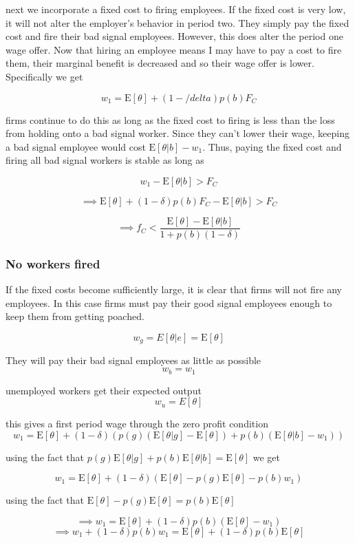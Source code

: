 \documentclass[11pt]{article}
\newcommand{\E}{\mathrm{E}}
\begin{document}
next we incorporate a fixed cost to firing employees. If the fixed cost is very low, it will not alter the employer's behavior in period two. They simply pay the fixed cost and fire their bad signal employees. However, this does alter the period one wage offer. Now that hiring an employee means I may have to pay a cost to fire them, their marginal benefit is decreased and so their wage offer is lower. Specifically we get

$$ w_1 = \E[\theta] + (1- /delta)p(b)F_C$$

firms continue to do this as long as the fixed cost to firing is less than the loss from holding onto a bad signal worker. Since they can't lower their wage, keeping a bad signal employee would cost $\E[\theta|b] - w_1$. Thus, paying the fixed cost and firing all bad signal workers is stable as long as 

$$ w_1 - \E[\theta|b] > F_C$$

$$ \implies  \E[\theta] + (1- \delta)p(b)F_C -  \E[\theta|b] > F_C $$

$$ \implies f_C < \frac{\E[\theta] -  \E[\theta|b]}{1 + p(b)(1-\delta)} $$

\subsubsection{No workers fired} 
If the fixed costs become sufficiently large, it is clear that firms will not fire any employees. In this case firms must pay their good signal employees enough to keep them from getting poached. 

$$ w_g = E[\theta | e] =\E[\theta]$$

They will pay their bad signal employees as little as possible 
$$ w_b = w_1$$ 

unemployed workers get their expected output 
$$ w_u = E[\theta] $$

this gives a first period wage through the zero profit condition 
$$w_1 = \E[\theta] + (1-\delta)(p(g)(\E[\theta|g] - \E[\theta]) + p(b)(\E[\theta|b] - w_1))$$


using the fact that $p(g)\E[\theta|g] + p(b)\E[\theta|b] = \E[\theta]$ we get 

$$ w_1 = \E[\theta] +  (1-\delta)(\E[\theta] - p(g)\E[\theta] - p(b)w_1)$$

using the fact that $ \E[\theta] - p(g)\E[\theta] = p(b)\E[\theta]$

$$ \implies  w_1 = \E[\theta] +  (1-\delta)p(b)(\E[\theta] - w_1) $$
$$ \implies w_1 +(1-\delta)p(b)w_1 = \E[\theta] + (1-\delta)p(b)\E[\theta]$$
\end{document}
